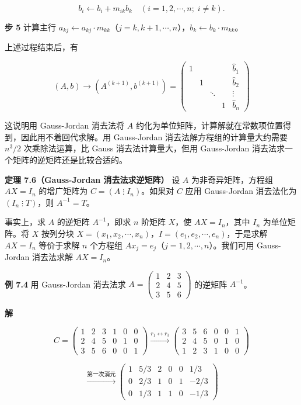 \[b_i\leftarrow b_i+m_{ik}b_k\quad(i=1,2,\cdots,n;\;i\ne k).\]

\textbf{步 5} 计算主行 \(a_{kj}\leftarrow a_{kj}\cdot m_{kk}\)（\(j=k,k+1,\cdots,n\)），\(b_k\leftarrow b_k\cdot m_{kk}\)。

上述过程结束后，有

\[
(A,b)\to(A^{(k+1)},b^{(k+1)})=
\left(\begin{array}{cccc|c}
1&&&&\widehat{b}_1\\
&1&&&\widehat{b}_2\\
&&\ddots&&\vdots\\
&&&1&\widehat{b}_n
\end{array}\right)
\]

这说明用 Gauss-Jordan 消去法将 \(A\) 约化为单位矩阵，计算解就在常数项位置得到，因此用不着回代求解。用 Gauss-Jordan 消去法解方程组的计算量大约需要 \(n^3/2\) 次乘除法运算，比 Gauss 消去法计算量大，但用 Gauss-Jordan 消去法求一个矩阵的逆矩阵还是比较合适的。

\textbf{定理 7.6（Gauss-Jordan 消去法求逆矩阵）} 设 \(A\) 为非奇异矩阵，方程组 \(AX=I_n\) 的增广矩阵为 \(C=(A\mathbin{\vdots}I_n)\)。如果对 \(C\) 应用 Gauss-Jordan 消去法化为 \((I_n\mathbin{\vdots}T)\)，则 \(A^{-1}=T\)。

事实上，求 \(A\) 的逆矩阵 \(A^{-1}\)，即求 \(n\) 阶矩阵 \(X\)，使 \(AX=I_n\)，其中 \(I_n\) 为单位矩阵。将 \(X\) 按列分块 \(X=(x_1,x_2,\cdots,x_n)\)，\(I=(e_1,e_2,\cdots,e_n)\)，于是求解 \(AX=I_n\) 等价于求解 \(n\) 个方程组 \(Ax_j=e_j\)（\(j=1,2,\cdots,n\)）。我们可用 Gauss-Jordan 消去法求解 \(AX=I_n\)。

\textbf{例 7.4} 用 Gauss-Jordan 消去法求 \(A=\begin{pmatrix}1&2&3\\2&4&5\\3&5&6\end{pmatrix}\) 的逆矩阵 \(A^{-1}\)。

\textbf{解}

\[
C=\left(\begin{array}{rrr|rrr}
1&2&3&1&0&0\\
2&4&5&0&1&0\\
3&5&6&0&0&1
\end{array}\right)
\xrightarrow{r_1\leftrightarrow r_3}
\left(\begin{array}{rrr|rrr}
\boxed{3}&5&6&0&0&1\\
2&4&5&0&1&0\\
1&2&3&1&0&0
\end{array}\right)
\]

\[
\xrightarrow{\text{第一次消元}}
\left(\begin{array}{rrr|rrr}
1&5/3&2&0&0&1/3\\
0&2/3&1&0&1&-2/3\\
0&1/3&1&1&0&-1/3
\end{array}\right)
\]

